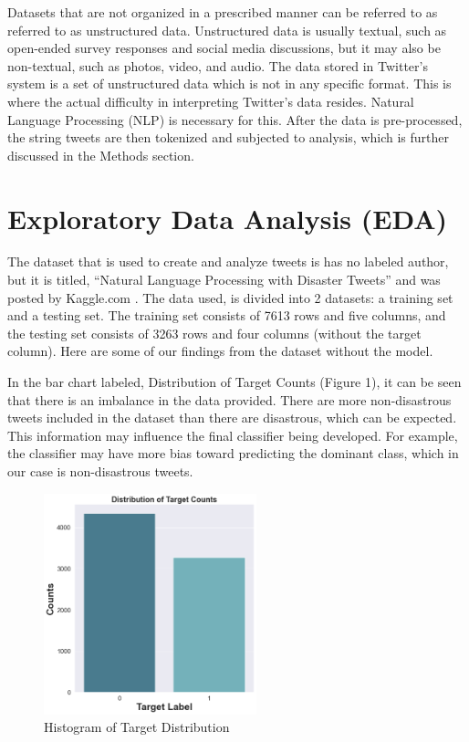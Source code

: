 \documentclass{article}
\begin{document}
Datasets that are not organized in a prescribed manner can be referred to as referred to as unstructured data. Unstructured data is usually textual, such as open-ended survey responses and social media discussions, but it may also be non-textual, such as photos, video, and audio. The data stored in Twitter's system is a set of unstructured data which is not in any specific format. This is where the actual difficulty in interpreting Twitter's data resides. Natural Language Processing (NLP) is necessary for this. After the data is pre-processed, the string tweets are then tokenized and subjected to analysis, which is further discussed in the Methods section.



\section{Exploratory Data Analysis (EDA)}
The dataset that is used to create and analyze tweets is  has no labeled author, but it is titled, ``Natural Language Processing with Disaster Tweets” and was posted by Kaggle.com \cite{9}. The data used, is divided into 2 datasets: a training set and a testing set. The training set consists of 7613 rows and five columns, and the testing set consists of 3263 rows and four columns (without the target column). Here are some of our findings from the dataset without the model. 

In the bar chart labeled, Distribution of Target Counts (Figure 1), it can be seen that there is an imbalance in the data provided. There are more non-disastrous tweets included in the dataset than there are disastrous, which can be expected. This information may influence the final classifier being developed. For example, the classifier may have more bias toward predicting the dominant class, which in our case is non-disastrous tweets. 

\begin{figure}[!h]
    \centering
    \includegraphics[width=0.55\textwidth, left]{bar.png}
    \caption{Histogram of Target Distribution}
    \label{fig:bar}
\end{figure}
\end{document}

